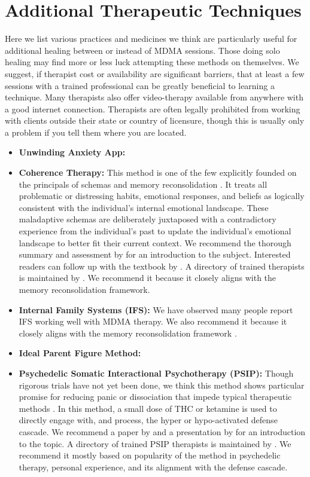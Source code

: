 \documentclass[12pt,letterpaper]{book}
\begin{document}
\section{Additional Therapeutic Techniques}
\label{healingPractices}
Here we list various practices and medicines we think are particularly useful for additional healing between or instead of MDMA sessions. Those doing solo healing may find more or less luck attempting these methods on themselves. We suggest, if therapist cost or availability are significant barriers, that at least a few sessions with a trained professional can be greatly beneficial to learning a technique. Many therapists also offer video-therapy available from anywhere with a good internet connection. Therapists are often legally prohibited from working with clients outside their state or country of licensure, though this is usually only a problem if you tell them where you are located.
\begin{itemize}
	\item \textbf{Unwinding Anxiety App:}
    \item \textbf{Coherence Therapy:} This method is one of the few explicitly founded on the principals of schemas and memory reconsolidation \cite{eckerUnlocking}. It treats all problematic or distressing habits, emotional responses, and beliefs as logically consistent with the individual's internal emotional landscape. These maladaptive schemas are deliberately juxtaposed with a contradictory experience from the individual's past to update the individual's emotional landscape to better fit their current context. We recommend the thorough summary and assessment by \textcite{lesswrongCoherenceTherapy} for an introduction to the subject. Interested readers can follow up with the textbook by \textcite{eckerUnlocking}. A directory of trained therapists is maintained by \textcite{coherenceDirectory}. We recommend it because it closely aligns with the memory reconsolidation framework.
    \item \textbf{Internal Family Systems (IFS):} We have observed many people report IFS working well with MDMA therapy. We also recommend it because it closely aligns with the memory reconsolidation framework \cite{eckerUnlocking}.
\label{def:ipf}
    \item \textbf{Ideal Parent Figure Method:} 
    \item \textbf{Psychedelic Somatic Interactional Psychotherapy (PSIP):} Though rigorous trials have not yet been done, we think this method shows particular promise for reducing panic or dissociation that impede typical therapeutic methods \cite{razviPSIP,ragnhildstveit2023cannabis}. In this method, a small dose of THC or ketamine is used to directly engage with, and process, the hyper or hypo-activated defense cascade. We recommend a paper by \textcite{razviPSIP} and a presentation by \textcite{razviPresentation} for an introduction to the topic. A directory of trained PSIP therapists is maintained by \textcite{psipDirectory}. We recommend it mostly based on popularity of the method in psychedelic therapy, personal experience, and its alignment with the defense cascade.
\end{itemize}
\end{document}
